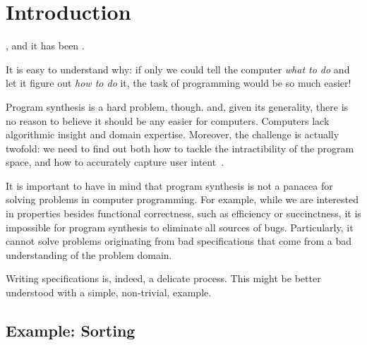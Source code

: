 \chapter{Introduction}
\label{chapter:introduction}



 , and it has been
.

It is easy to understand why: if only we could tell the computer \textit{what to
do} and let it figure out \textit{how to do} it, the task of programming would
be so much easier!

Program synthesis is a hard problem, though.  and, given its generality,
there is no reason to believe it should be any easier for computers. Computers
lack algorithmic insight and domain expertise. Moreover, the challenge is
actually twofold: we need to find out both how to tackle the intractibility of
the program space, and how to accurately capture user intent~\cite{Gulwani2017}.


It is important to have in mind that program synthesis is not a panacea for
solving problems in computer programming. For example, while we are interested
in properties besides functional correctness, such as efficiency or
succinctness, it is impossible for program synthesis to eliminate all sources of
bugs. Particularly, it cannot solve problems originating from bad specifications
that come from a bad understanding of the problem domain.

Writing specifications is, indeed, a delicate process. This might be better
understood with a simple, non-trivial, example.

\section{Example: Sorting}
\label{sec:sorting-example}

